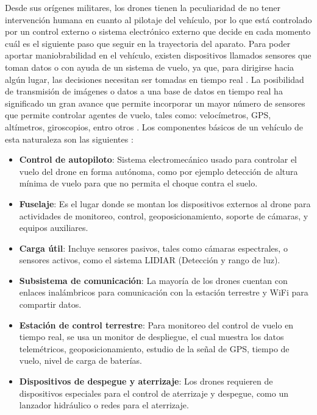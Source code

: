 Desde sus orígenes militares, los drones tienen la peculiaridad de no tener 
intervención humana en cuanto al pilotaje del vehículo, por lo que está 
controlado por un control externo o sistema electrónico externo que decide en 
cada momento cuál es el siguiente paso que seguir en la trayectoria del aparato. 
Para poder aportar maniobrabilidad en el vehículo, existen dispositivos llamados 
sensores que toman datos o con ayuda de un sistema de vuelo, ya que, para 
dirigirse hacia algún lugar, las decisiones necesitan ser tomadas en tiempo real 
\cite{vehiculos_aereos_no_trip_apps}.
La posibilidad de transmisión de imágenes o datos a una base de datos en tiempo 
real ha significado un gran avance que permite incorporar un mayor número de 
sensores que permite controlar agentes de vuelo, tales como: velocímetros, GPS, 
altímetros, giroscopios, entro otros \cite{vehiculos_aereos_no_trip_apps}.
Los componentes básicos de un vehículo de esta naturaleza son las siguientes 
\cite{vehiculos_aereos_no_trip_apps, app_veh_no_tripulados_hidr}:

\begin{itemize}
	\item \textbf{Control de autopiloto}: Sistema electromecánico usado para 
controlar el vuelo del drone en forma autónoma, como por ejemplo detección de 
altura mínima de vuelo para que no permita el choque contra el suelo.
	\item \textbf{Fuselaje}: Es el lugar donde se montan los dispositivos 
externos al drone para actividades de monitoreo, control, geoposicionamiento, 
soporte de cámaras, y equipos auxiliares.
	\item \textbf{Carga útil}: Incluye sensores pasivos, tales como cámaras 
espectrales, o sensores activos, como el sistema LIDIAR (Detección y rango de 
luz).
	\item \textbf{Subsistema de comunicación}: La mayoría de los drones 
cuentan con enlaces inalámbricos para comunicación con la estación terrestre y 
WiFi para compartir datos.
	\item \textbf{Estación de control terrestre}: Para monitoreo del control 
de vuelo en tiempo real, se usa un monitor de despliegue, el cual muestra los 
datos telemétricos, geoposicionamiento, estudio de la señal de GPS, tiempo de 
vuelo, nivel de carga de baterías.
	\item \textbf{Dispositivos de despegue y aterrizaje}: Los drones 
requieren de dispositivos especiales para el control de aterrizaje y despegue, 
como un lanzador hidráulico o redes para el aterrizaje.
\end{itemize}

